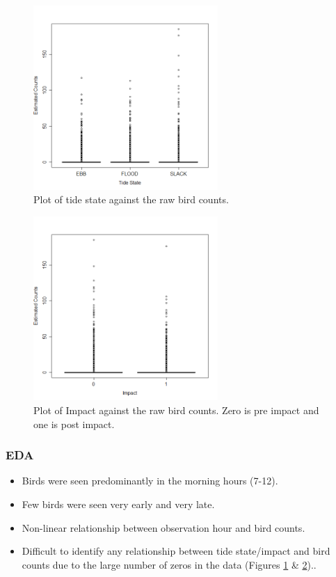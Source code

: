 \begin{frame}
\begin{figure}[h!]
  \centering
  \includegraphics[width=7cm]{bc/floodebb.png}
\caption{Plot of tide state against the raw bird counts.}
\label{fig:nsexploratory2}
\end{figure}
\end{frame}
\begin{frame}
\begin{figure}[h!]
  \centering
  \includegraphics[width=7cm]{bc/impact.png}
\caption{Plot of Impact against the raw bird counts. Zero is pre impact and one is post impact.}
\label{fig:nsexploratory3}
\end{figure}
\end{frame}


\begin{frame}
\frametitle{EDA}
\begin{itemize}
\item Birds were seen predominantly in the morning hours (7-12).
\item Few birds were seen very early and very late.  
\item Non-linear relationship between observation hour and bird counts.  
\item Difficult to identify any relationship between tide state/impact and bird counts due to the large number of zeros in the data (Figures \ref{fig:nsexploratory2} \&  \ref{fig:nsexploratory3})..
\end{itemize}
\end{frame}
\clearpage
